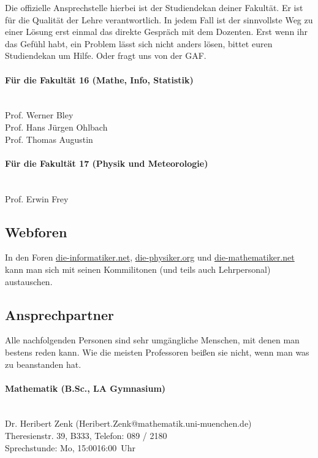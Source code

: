 \documentclass[twoside,12pt,parskip=half-]{scrartcl}
\newcommand{\emd}{\textendash}
\begin{document}
Die offizielle Ansprechstelle hierbei ist der Studiendekan deiner
Fakultät.  Er ist für die Qualität der Lehre verantwortlich. In jedem
Fall ist der sinnvollste Weg zu einer Lösung erst einmal das direkte
Gespräch mit dem Dozenten. Erst wenn ihr das Gefühl habt, ein Problem
lässt sich nicht anders lösen, bittet euren Studiendekan um
Hilfe. Oder fragt uns von der GAF.

\paragraph{Für die Fakultät 16 (Mathe, Info, Statistik)}\hfill\\
Prof. Werner Bley\\
Prof. Hans Jürgen Ohlbach\\
Prof. Thomas Augustin

\paragraph{Für die Fakultät 17 (Physik und Meteorologie)}\hfill\\
Prof. Erwin Frey

\subsection{Webforen}

In den Foren \url{die-informatiker.net}, \url{die-physiker.org}
und \url{die-mathematiker.net} kann man sich mit seinen Kommilitonen
(und teils auch Lehrpersonal) austauschen.


\subsection{Ansprechpartner}

Alle nachfolgenden Personen sind sehr umgängliche Menschen, mit denen
man bestens reden kann. Wie die meisten Professoren beißen sie nicht,
wenn man was zu beanstanden hat.

\paragraph{Mathematik (B.Sc., LA Gymnasium)}\hfill\\
Dr. Heribert Zenk (Heribert.Zenk@mathematik.uni-muenchen.de)\\
Theresienstr. 39, B333, Telefon: 089 / 2180\\
Sprechstunde: Mo, 15:00\emd{}16:00~Uhr\\
\end{document}
